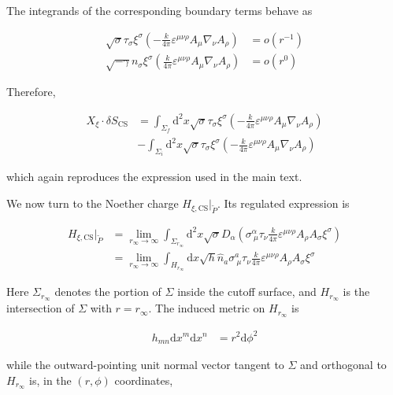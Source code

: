 The integrands of the corresponding boundary terms behave as

\begin{align}
\sqrt{ \sigma }\tau _{\sigma}\xi ^{\sigma}\left(-\frac{k}{4\pi}\varepsilon ^{\mu \nu \rho}A_{\mu}\nabla _{\nu}A_{\rho}\right) & =o(r^{-1}) \\
\sqrt{ -\gamma }n_{\sigma}\xi ^{\sigma}\left(\frac{k}{4\pi}\varepsilon ^{\mu \nu \rho}A_{\mu}\nabla _{\nu}A_{\rho}\right) & =o(r^{0})
\end{align}

Therefore,

\begin{align}
X_{\xi}\cdot \delta S_{\text{CS}} & =\int _{\Sigma _{f}}\mathrm{d}^{2}x\sqrt{ \sigma }\tau _{\sigma}\xi ^{\sigma}\left(-\frac{k}{4\pi}\varepsilon ^{\mu \nu \rho}A_{\mu}\nabla _{\nu}A_{\rho}\right) \\
 & -\int _{\Sigma _{i}}\mathrm{d}^{2}x\sqrt{ \sigma }\tau _{\sigma}\xi ^{\sigma}\left(-\frac{k}{4\pi}\varepsilon ^{\mu \nu \rho}A_{\mu}\nabla _{\nu}A_{\rho}\right)
\end{align}

which again reproduces the expression used in the main text.

We now turn to the Noether charge $H_{\xi,\mathrm{CS}}|_{\widetilde{P}}$. Its regulated expression is

\begin{align}
H_{\xi,\mathrm{CS}}|_{\widetilde{P}} & =\lim_{ r_{\infty} \to \infty }\int _{\Sigma _{r_{\infty}}}\mathrm{d}^{2}x\sqrt{ \sigma }D_{\alpha}\left( \sigma ^{\alpha}_{~\mu}\tau _{\nu}\frac{k}{4\pi}\varepsilon ^{\mu \nu \rho}A_{\rho} A_{\sigma}\xi ^{\sigma} \right) \\
 & =\lim_{ r_{\infty} \to \infty }\int _{H_{r_{\infty}}} \mathrm{d}x\sqrt{ h }\hat{n}_{a}\sigma ^{a}_{~\mu}\tau _{\nu}\frac{k}{4\pi}\varepsilon ^{\mu \nu \rho}A_{\rho}A_{\sigma}\xi ^{\sigma}
\end{align}

Here $\Sigma _{r_{\infty}}$ denotes the portion of $\Sigma$ inside the cutoff surface, and $H_{r_{\infty}}$ is the intersection of $\Sigma$ with $r=r_{\infty}$. The induced metric on $H_{r_{\infty}}$ is

\begin{align}
h_{mn}\mathrm{d}x^{m}\mathrm{d}x^{n} & =r^{2}\mathrm{d}\phi ^{2}
\end{align}

while the outward-pointing unit normal vector tangent to $\Sigma$ and orthogonal to $H_{r_{\infty}}$ is, in the $(r,\phi)$ coordinates,

